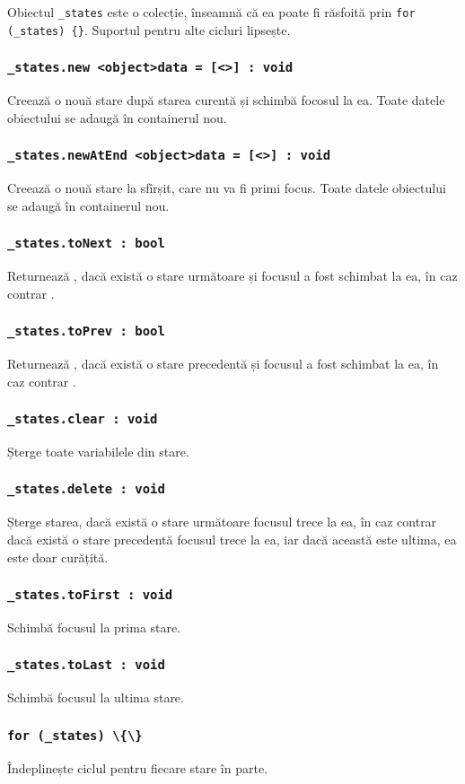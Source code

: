 Obiectul \lstinline|_states| este o colecție, înseamnă că ea poate fi răsfoită prin \lstinline|for (_states) {}|. Suportul pentru alte cicluri lipsește.

\subsubsection{\lstinline|_states.new <object>data = [<>] : void|}

Creează o nouă stare după starea curentă și schimbă focosul la ea. Toate datele obiectului  se adaugă în containerul nou.

\subsubsection{\lstinline|_states.newAtEnd <object>data = [<>] : void|}

Creează o nouă stare la sfîrșit, care nu va fi primi focus.  Toate datele obiectului  se adaugă în containerul nou.

\subsubsection{\lstinline|_states.toNext : bool|}

Returnează \true, dacă există o stare următoare și focusul a fost schimbat la ea, în caz contrar \false.

\subsubsection{\lstinline|_states.toPrev : bool|}

Returnează \true, dacă există o stare precedentă și focusul a fost schimbat la ea, în caz contrar \false.

\subsubsection{\lstinline|_states.clear : void|}

Șterge toate variabilele din stare.

\subsubsection{\lstinline|_states.delete : void|}

Șterge starea, dacă există o stare următoare focusul trece la ea, în caz contrar dacă există o stare precedentă focusul trece la ea, iar dacă această este ultima, ea este doar curățită.

\subsubsection{\lstinline|_states.toFirst : void|}

Schimbă focusul la prima stare.

\subsubsection{\lstinline|_states.toLast : void|}

Schimbă focusul la ultima stare.

\subsubsection{\lstinline|for (_states) \{\}|}

Îndeplinește ciclul pentru fiecare stare în parte.

